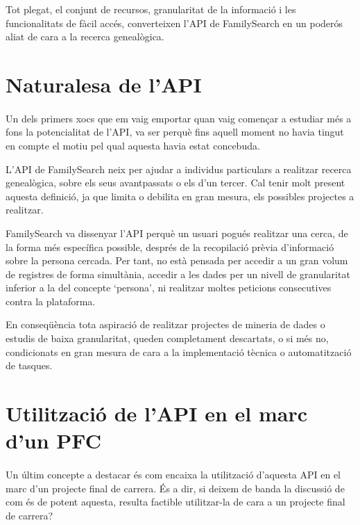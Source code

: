     Tot plegat, el conjunt de recursos, granularitat de la informació i les funcionalitats de fàcil accés, converteixen l'API de FamilySearch en un poderós aliat de cara a la recerca genealògica.


\section{Naturalesa de l'API}

    \paragraph{}
    Un dels primers xocs que em vaig emportar quan vaig començar a estudiar més a fons la potencialitat de l'API, va ser perquè fins aquell moment no havia tingut en compte el motiu pel qual aquesta havia estat concebuda.

    L'API de FamilySearch neix per ajudar a individus particulars a realitzar recerca genealògica, sobre els seus avantpassats o els d'un tercer. Cal tenir molt present aquesta definició, ja que limita o debilita en gran mesura, els possibles projectes a realitzar.

    FamilySearch va dissenyar l'API perquè un usuari pogués realitzar una cerca, de la forma més específica possible, després de la recopilació prèvia d'informació sobre la persona cercada. Per tant, no està pensada per accedir a un gran volum de registres de forma simultània, accedir a les dades per un nivell de granularitat inferior a la del concepte `persona', ni realitzar moltes peticions consecutives contra la plataforma.

    En conseqüència tota aspiració de realitzar projectes de mineria de dades o estudis de baixa granularitat, queden completament descartats, o si més no, condicionats en gran mesura de cara a la implementació tècnica o automatització de tasques.


\section{Utilització de l'API en el marc d'un PFC}

    \paragraph{}
    Un últim concepte a destacar és com encaixa la utilització d'aquesta API en el marc d'un projecte final de carrera. És a dir, si deixem de banda la discussió de com és de potent aquesta, resulta factible utilitzar-la de cara a un projecte final de carrera?

